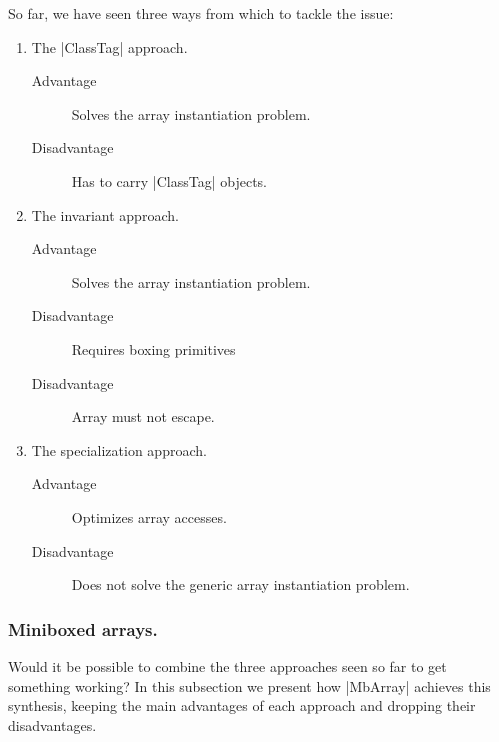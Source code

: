 
So far, we have seen three ways from which to tackle the issue:

\begin{enumerate}
  \item The |ClassTag| approach.
    \begin{description}
      \item[Advantage] 	Solves the array instantiation problem.
      \item[Disadvantage] Has to carry |ClassTag| objects.
    \end{description}
  \item The invariant approach.
    \begin{description}
      \item[Advantage] 	Solves the array instantiation problem.
      \item[Disadvantage] Requires boxing primitives
      \item[Disadvantage] Array must not escape.
    \end{description}
  \item The specialization approach.
    \begin{description}
      \item[Advantage] 	Optimizes array accesses.
      \item[Disadvantage] Does not solve the generic array instantiation problem.
    \end{description}
\end{enumerate}

\subsubsection{Miniboxed arrays.}


Would it be possible to combine the three approaches seen so far to get something working? In this subsection we present how |MbArray| achieves this synthesis, keeping the main advantages of each approach and dropping their disadvantages. 

